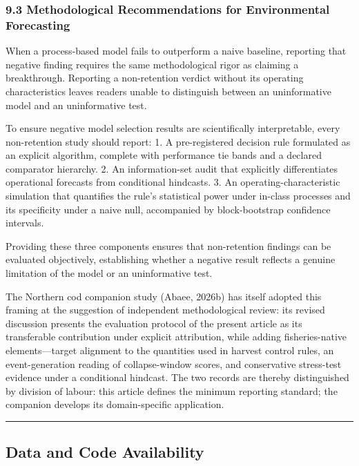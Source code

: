 \documentclass[11pt]{article}
\begin{document}
\subsubsection{9.3 Methodological Recommendations for Environmental
Forecasting}\label{methodological-recommendations-for-environmental-forecasting}

When a process-based model fails to outperform a naive baseline,
reporting that negative finding requires the same methodological rigor
as claiming a breakthrough. Reporting a non-retention verdict without
its operating characteristics leaves readers unable to distinguish
between an uninformative model and an uninformative test.

To ensure negative model selection results are scientifically
interpretable, every non-retention study should report: 1. A
pre-registered decision rule formulated as an explicit algorithm,
complete with performance tie bands and a declared comparator hierarchy.
2. An information-set audit that explicitly differentiates operational
forecasts from conditional hindcasts. 3. An operating-characteristic
simulation that quantifies the rule's statistical power under in-class
processes and its specificity under a naive null, accompanied by
block-bootstrap confidence intervals.

Providing these three components ensures that non-retention findings can
be evaluated objectively, establishing whether a negative result
reflects a genuine limitation of the model or an uninformative test.

The Northern cod companion study (Abaee, 2026b) has itself adopted this
framing at the suggestion of independent methodological review: its
revised discussion presents the evaluation protocol of the present
article as its transferable contribution under explicit attribution,
while adding fisheries-native elements---target alignment to the
quantities used in harvest control rules, an event-generation reading of
collapse-window scores, and conservative stress-test evidence under a
conditional hindcast. The two records are thereby distinguished by
division of labour: this article defines the minimum reporting standard;
the companion develops its domain-specific application.

\begin{center}\rule{0.5\linewidth}{0.5pt}\end{center}

\subsection{Data and Code
Availability}\label{data-and-code-availability}
\end{document}
